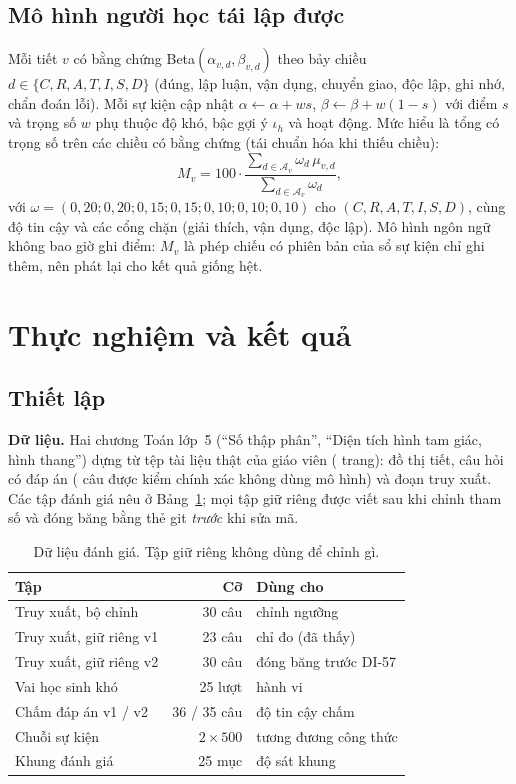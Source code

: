 \documentclass[10pt,a4paper,twocolumn]{article}
\begin{document}
\subsection{Mô hình người học tái lập được}
Mỗi tiết $v$ có bằng chứng Beta$(\alpha_{v,d},\beta_{v,d})$ theo bảy chiều $d\in\{C,R,A,T,I,S,D\}$ (đúng, lập luận, vận dụng, chuyển giao, độc lập, ghi nhớ, chẩn đoán lỗi). Mỗi sự kiện cập nhật $\alpha\leftarrow\alpha+ws$, $\beta\leftarrow\beta+w(1-s)$ với điểm $s$ và trọng số $w$ phụ thuộc độ khó, bậc gợi ý $\iota_h$ và hoạt động. Mức hiểu là tổng có trọng số trên các chiều có bằng chứng (tái chuẩn hóa khi thiếu chiều):
\begin{equation}
M_v=100\cdot\frac{\sum_{d\in\mathcal{A}_v}\omega_d\,\mu_{v,d}}{\sum_{d\in\mathcal{A}_v}\omega_d},
\end{equation}
với $\omega=(0{,}20;0{,}20;0{,}15;0{,}15;0{,}10;0{,}10;0{,}10)$ cho $(C,R,A,T,I,S,D)$,
cùng độ tin cậy và các cổng chặn (giải thích, vận dụng, độc lập). Mô hình ngôn ngữ không bao giờ ghi điểm: $M_v$ là phép chiếu có phiên bản của sổ sự kiện chỉ ghi thêm, nên phát lại cho kết quả giống hệt.

\section{Thực nghiệm và kết quả}\label{sec:exp}
\subsection{Thiết lập}
\textbf{Dữ liệu.} Hai chương Toán lớp~5 (``Số thập phân'', ``Diện tích hình tam giác, hình thang'') dựng từ \NDocs{} tệp tài liệu thật của giáo viên (\NPages{} trang): đồ thị \NNodes{} tiết, \NItems{} câu hỏi có đáp án (\NVerified{} câu được kiểm chính xác không dùng mô hình) và \NChunks{} đoạn truy xuất. Các tập đánh giá nêu ở Bảng~\ref{tab:setup}; mọi tập giữ riêng được viết sau khi chỉnh tham số và đóng băng bằng thẻ git \emph{trước} khi sửa mã.

\begin{table}[tbp]
\centering
\caption{Dữ liệu đánh giá. Tập giữ riêng không dùng để chỉnh gì.}\label{tab:setup}
\footnotesize
\begin{tabular}{@{}>{\raggedright\arraybackslash}p{3.3cm}rl@{}}
\toprule
Tập & Cỡ & Dùng cho \\
\midrule
Truy xuất, bộ chỉnh & 30 câu & chỉnh ngưỡng \\
Truy xuất, giữ riêng v1 & 23 câu & chỉ đo (đã thấy) \\
Truy xuất, giữ riêng v2 & 30 câu & đóng băng trước DI-57 \\
Vai học sinh khó & 25 lượt & hành vi \\
Chấm đáp án v1 / v2 & 36 / 35 câu & độ tin cậy chấm \\
Chuỗi sự kiện & $2\times500$ & tương đương công thức \\
Khung đánh giá & 25 mục & độ sát khung \\
\bottomrule
\end{tabular}
\end{table}
\end{document}
